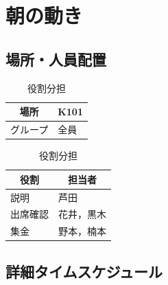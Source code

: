 \section{朝の動き}

\subsection{場所・人員配置}
\begin{table}[h]
  \centering
  \begin{minipage}[t]{0.48\columnwidth}
    \centering
    \caption{場所・該当グループ}
    \begin{tabular}{cl}
      \hline
      場所 & K101 \\
      \hline
      グループ & 全員 \\
      \hline
    \end{tabular}
  \end{minipage}
  \begin{minipage}[t]{0.48\columnwidth}
    \centering
    \caption{役割分担}
    \begin{tabular}{ll}
      \hline
      \multicolumn{1}{c}{役割} & \multicolumn{1}{c}{担当者} \\
      \hline
      説明 & 芦田 \\
      出席確認 & 花井，黒木 \\
      集金 & 野本，楠本 \\
      \hline
    \end{tabular}
  \end{minipage}
\end{table}

\subsection{詳細タイムスケジュール}
\vspace{0.5em}
\fontsize{8pt}{12pt}\selectfont

